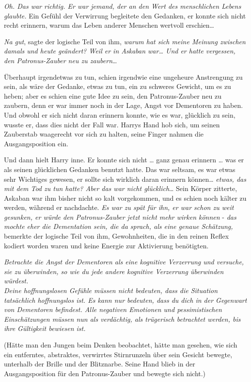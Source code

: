 {\emph{Oh. Das war richtig. Er war jemand, der an den Wert des menschlichen Lebens glaubte.} Ein Gefühl der Verwirrung begleitete den Gedanken, er konnte sich nicht recht erinnern, warum das Leben anderer Menschen wertvoll erschien…

\emph{Na gut}, sagte der logische Teil von ihm, \emph{warum hat sich meine Meinung zwischen damals und heute geändert? Weil er in Askaban war… Und er hatte vergessen, den Patronus-Zauber neu zu zaubern}…

Überhaupt irgendetwas zu tun, schien irgendwie eine ungeheure Anstrengung zu sein, als wäre der Gedanke, etwas zu tun, ein zu schweres Gewicht, um es zu heben; aber es schien eine gute Idee zu sein, den Patronus-Zauber neu zu zaubern, denn er war immer noch in der Lage, Angst vor Dementoren zu haben. Und obwohl er sich nicht daran erinnern konnte, wie es war, glücklich zu sein, wusste er, dass dies nicht der Fall war. Harrys Hand hob sich, um seinen Zauberstab waagerecht vor sich zu halten, seine Finger nahmen die Ausgangsposition ein.

Und dann hielt Harry inne. Er konnte sich nicht … ganz genau erinnern … was er als seinen glücklichen Gedanken benutzt hatte. Das war seltsam, es war etwas sehr Wichtiges gewesen, er sollte sich wirklich daran erinnern können… \emph{etwas, das mit dem Tod zu tun hatte? Aber das war nicht glücklich}… Sein Körper zitterte, Askaban war ihm bisher nicht so kalt vorgekommen, und es schien noch kälter zu werden, während er nachdachte. \emph{Es war zu spät für ihn, er war schon zu weit gesunken, er würde den Patronus-Zauber jetzt nicht mehr wirken können} - \emph{das mochte eher die Dementation sein, die da sprach, als eine genaue Schätzung,} bemerkte der logische Teil von ihm, Gewohnheiten, die in den reinen Reflex kodiert worden waren und keine Energie zur Aktivierung benötigten.

\emph{Betrachte die Angst der Dementoren als eine kognitive Verzerrung und versuche, sie zu überwinden, so wie du jede andere kognitive Verzerrung überwinden würdest.\\ Deine hoffnungslosen Gefühle müssen nicht bedeuten, dass die Situation tatsächlich hoffnungslos ist. Es kann nur bedeuten, dass du dich in der Gegenwart von Dementoren befindest. Alle negativen Emotionen und pessimistischen Einschätzungen müssen nun als verdächtig, als trügerisch betrachtet werden, bis ihre Gültigkeit bewiesen ist.}

(Hätte man den Jungen beim Denken beobachtet, hätte man gesehen, wie sich ein entferntes, abstraktes, verwirrtes Stirnrunzeln über sein Gesicht bewegte, unterhalb der Brille und der Blitznarbe. Seine Hand blieb in der Ausgangsposition für den Patronus-Zauber und bewegte sich nicht.)

}
